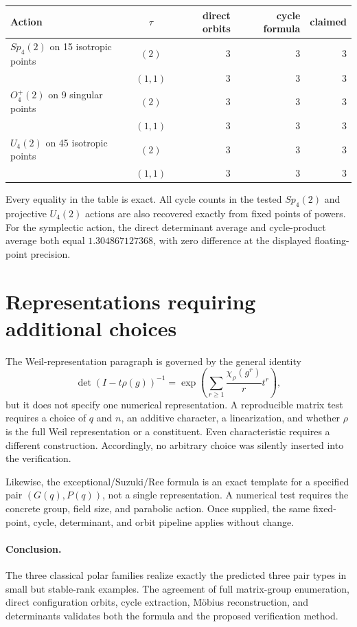 \documentclass[10pt]{article}
\begin{document}
\begin{center}
\begin{tabular}{@{}lcrrr@{}}
\toprule
Action & $\tau$ & direct orbits & cycle formula & claimed\\
\midrule
$Sp_4(2)$ on 15 isotropic points & $(2)$ &3&3&3\\
 & $(1,1)$ &3&3&3\\
$O_4^+(2)$ on 9 singular points & $(2)$ &3&3&3\\
 & $(1,1)$ &3&3&3\\
$U_4(2)$ on 45 isotropic points & $(2)$ &3&3&3\\
 & $(1,1)$ &3&3&3\\
\bottomrule
\end{tabular}
\end{center}

Every equality in the table is exact.  All cycle counts in the tested
$Sp_4(2)$ and projective $U_4(2)$ actions are also recovered exactly from
fixed points of powers.  For the symplectic action, the direct determinant
average and cycle-product average both equal $1.304867127368$, with zero
difference at the displayed floating-point precision.

\section{Representations requiring additional choices}
The Weil-representation paragraph is governed by the general identity
\[
 \det(I-t\rho(g))^{-1}=\exp\left(
 \sum_{r\geq1}\frac{\chi_\rho(g^r)}{r}t^r\right),
\]
but it does not specify one numerical representation.  A reproducible matrix
test requires a choice of $q$ and $n$, an additive character, a linearization,
and whether $\rho$ is the full Weil representation or a constituent.  Even
characteristic requires a different construction.  Accordingly, no arbitrary
choice was silently inserted into the verification.

Likewise, the exceptional/Suzuki/Ree formula is an exact template for a
specified pair $(G(q),P(q))$, not a single representation.  A numerical test
requires the concrete group, field size, and parabolic action.  Once supplied,
the same fixed-point, cycle, determinant, and orbit pipeline applies without
change.

\paragraph{Conclusion.}
The three classical polar families realize exactly the predicted three pair
types in small but stable-rank examples.  The agreement of full matrix-group
enumeration, direct configuration orbits, cycle extraction, M\"obius
reconstruction, and determinants validates both the formula and the proposed
verification method.
\end{document}
